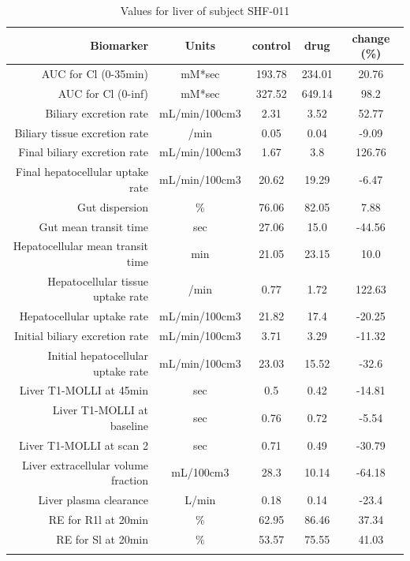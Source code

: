 \documentclass{epflreport}%
\begin{document}
%
\clearpage%
\begin{longtable}{rcccc}%
\hline%
Biomarker&Units&control&drug&change (\%)\\%
\hline%
AUC for Cl (0{-}35min)&mM*sec&193.78&234.01&20.76\\%
AUC for Cl (0{-}inf)&mM*sec&327.52&649.14&98.2\\%
Biliary excretion rate&mL/min/100cm3&2.31&3.52&52.77\\%
Biliary tissue excretion rate&/min&0.05&0.04&{-}9.09\\%
Final biliary excretion rate&mL/min/100cm3&1.67&3.8&126.76\\%
Final hepatocellular uptake rate&mL/min/100cm3&20.62&19.29&{-}6.47\\%
Gut dispersion&\%&76.06&82.05&7.88\\%
Gut mean transit time&sec&27.06&15.0&{-}44.56\\%
Hepatocellular mean transit time&min&21.05&23.15&10.0\\%
Hepatocellular tissue uptake rate&/min&0.77&1.72&122.63\\%
Hepatocellular uptake rate&mL/min/100cm3&21.82&17.4&{-}20.25\\%
Initial biliary excretion rate&mL/min/100cm3&3.71&3.29&{-}11.32\\%
Initial hepatocellular uptake rate&mL/min/100cm3&23.03&15.52&{-}32.6\\%
Liver T1{-}MOLLI at 45min&sec&0.5&0.42&{-}14.81\\%
Liver T1{-}MOLLI at baseline&sec&0.76&0.72&{-}5.54\\%
Liver T1{-}MOLLI at scan 2&sec&0.71&0.49&{-}30.79\\%
Liver extracellular volume fraction&mL/100cm3&28.3&10.14&{-}64.18\\%
Liver plasma clearance&L/min&0.18&0.14&{-}23.4\\%
RE for R1l at 20min&\%&62.95&86.46&37.34\\%
RE for Sl at 20min&\%&53.57&75.55&41.03\\%
\hline%
\caption{Values for liver of subject SHF-011} \\%
\end{longtable}%
\end{document}
